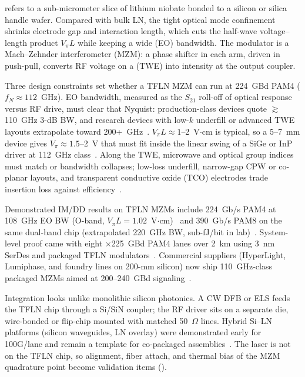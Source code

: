  refers to a sub-micrometer slice of lithium niobate bonded to a
silicon or silica handle wafer. Compared with bulk LN, the tight optical mode
confinement shrinks electrode gap and interaction length, which cuts the
half-wave voltage--length product $V_\pi L$ while keeping a wide
 (EO) bandwidth. The modulator is a Mach--Zehnder
interferometer (MZM): a  phase shifter in each arm, driven in
push-pull, converts RF voltage on a  (TWE) into
intensity at the output coupler.

Three design constraints set whether a TFLN MZM can run at 224~GBd PAM4
($f_N\approx112$~GHz). EO bandwidth, measured as the $S_{21}$ roll-off of optical
response versus RF drive, must clear that Nyquist: production-class devices quote
$\gtrsim$110~GHz 3-dB BW, and research devices with low-$k$ underfill or advanced
TWE layouts extrapolate toward 200+~GHz~.
$V_\pi L\approx1$--2~V$\cdot$cm is typical, so a 5--7~mm device gives
$V_\pi\approx1.5$--2~V that must fit inside the linear swing of a SiGe or InP
driver at 112~GHz class~. Along the TWE, microwave and
optical group indices must match or bandwidth collapses; low-loss underfill,
narrow-gap CPW or co-planar layouts, and transparent conductive oxide (TCO)
electrodes trade insertion loss against efficiency~.

Demonstrated IM/DD results on TFLN MZMs include 224~Gb/s PAM4 at 108~GHz EO BW
(O-band, $V_\pi L=1.02$~V$\cdot$cm)~ and 390~Gb/s PAM8 on the
same dual-band chip (extrapolated 220~GHz BW, sub-fJ/bit in lab)~.
System-level proof came with eight $\times$225~GBd PAM4 lanes over 2~km using
3~nm SerDes and packaged TFLN modulators~. Commercial
suppliers (HyperLight, Lumiphase, and foundry lines on 200-mm silicon) now ship
110~GHz-class packaged MZMs aimed at 200--240~GBd signaling~.

Integration looks unlike monolithic silicon photonics. A CW DFB or ELS feeds the
TFLN chip through a Si/SiN coupler; the RF driver sits on a separate die,
wire-bonded or flip-chip mounted with matched 50~$\Omega$ lines. Hybrid Si--LN
platforms (silicon waveguides, LN overlay) were demonstrated early for 100G/lane
and remain a template for co-packaged assemblies~. The laser
is not on the TFLN chip, so alignment, fiber attach, and thermal bias of the MZM
quadrature point become validation items ().

